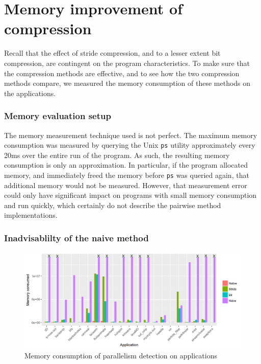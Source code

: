 \documentclass[12pt,twoside]{reedthesis}
\begin{document}
	\section{Memory improvement of compression}
		
		Recall that the effect of stride compression, and to a lesser extent bit compression, are contingent on the program characteristics. To make sure that the compression methods are effective, and to see how the two compression methods compare, we measured the memory consumption of these methods on the applications. 
		
		\subsubsection{Memory evaluation setup}
		
		The memory measurement technique used is not perfect. The maximum memory consumption was measured by querying the Unix \texttt{ps} utility approximately every 20ms over the entire run of the program. As such, the resulting memory consumption is only an approximation. In particular, if the program allocated memory, and immediately freed the memory before \texttt{ps} was queried again, that additional memory would not be measured. However, that measurement error could only have significant impact on programs with small memory consumption and run quickly, which certainly do not describe the pairwise method implementations.
		
		\subsubsection{Inadvisablilty of the naive method}
		
		
		\begin{figure}
			\caption{Memory consumption of parallelism detection on applications}
			\label{fig:mem-comp-plot}
			\includegraphics[scale=0.7]{plots/overall_plot.png}
		\end{figure}
		
\end{document}
